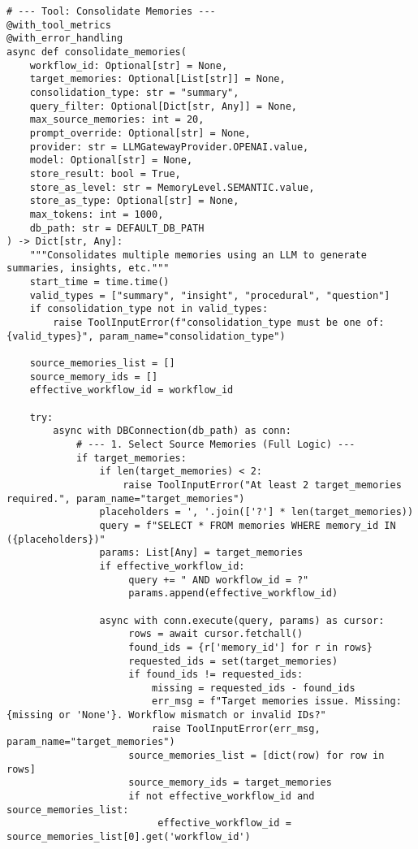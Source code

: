 \documentclass[12pt,a4paper]{article}
\begin{document}
\begin{pageablecode}
\begin{verbatim}
# --- Tool: Consolidate Memories ---
@with_tool_metrics
@with_error_handling
async def consolidate_memories(
    workflow_id: Optional[str] = None,
    target_memories: Optional[List[str]] = None,
    consolidation_type: str = "summary",
    query_filter: Optional[Dict[str, Any]] = None,
    max_source_memories: int = 20,
    prompt_override: Optional[str] = None,
    provider: str = LLMGatewayProvider.OPENAI.value,
    model: Optional[str] = None,
    store_result: bool = True,
    store_as_level: str = MemoryLevel.SEMANTIC.value,
    store_as_type: Optional[str] = None,
    max_tokens: int = 1000,
    db_path: str = DEFAULT_DB_PATH
) -> Dict[str, Any]:
    """Consolidates multiple memories using an LLM to generate summaries, insights, etc."""
    start_time = time.time()
    valid_types = ["summary", "insight", "procedural", "question"]
    if consolidation_type not in valid_types:
        raise ToolInputError(f"consolidation_type must be one of: {valid_types}", param_name="consolidation_type")

    source_memories_list = []
    source_memory_ids = []
    effective_workflow_id = workflow_id

    try:
        async with DBConnection(db_path) as conn:
            # --- 1. Select Source Memories (Full Logic) ---
            if target_memories:
                if len(target_memories) < 2:
                    raise ToolInputError("At least 2 target_memories required.", param_name="target_memories")
                placeholders = ', '.join(['?'] * len(target_memories))
                query = f"SELECT * FROM memories WHERE memory_id IN ({placeholders})"
                params: List[Any] = target_memories
                if effective_workflow_id:
                     query += " AND workflow_id = ?"
                     params.append(effective_workflow_id)

                async with conn.execute(query, params) as cursor:
                     rows = await cursor.fetchall()
                     found_ids = {r['memory_id'] for r in rows}
                     requested_ids = set(target_memories)
                     if found_ids != requested_ids:
                         missing = requested_ids - found_ids
                         err_msg = f"Target memories issue. Missing: {missing or 'None'}. Workflow mismatch or invalid IDs?"
                         raise ToolInputError(err_msg, param_name="target_memories")
                     source_memories_list = [dict(row) for row in rows]
                     source_memory_ids = target_memories
                     if not effective_workflow_id and source_memories_list:
                          effective_workflow_id = source_memories_list[0].get('workflow_id')


\end{verbatim}
\end{pageablecode}
\end{document}
